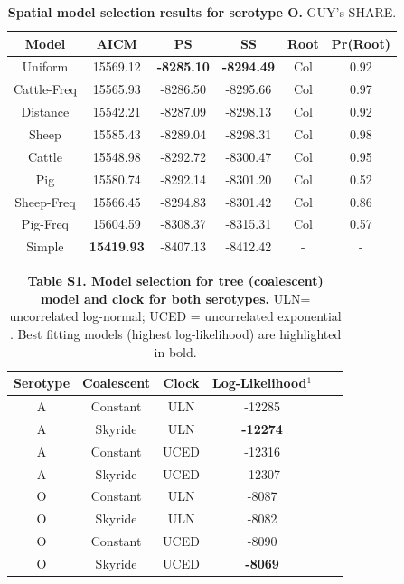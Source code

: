 \documentclass[10pt]{article}
\begin{document}
\begin{table}[!ht]
\caption{
\textbf{Spatial model selection results for serotype O. } GUY's SHARE.}
\begin{tabular}{c|c|c|c|c|c}
Model	&AICM	&PS	&SS	&Root	&Pr(Root)\\
\hline
Uniform	&15569.12	&\textbf{-8285.10}	&\textbf{-8294.49}	&Col	&0.92\\
Cattle-Freq	&15565.93	&-8286.50	&-8295.66	&Col	&0.97\\
Distance	&15542.21	&-8287.09	&-8298.13	&Col	&0.92\\
Sheep	&15585.43	&-8289.04	&-8298.31	&Col	&0.98\\
Cattle	&15548.98	&-8292.72	&-8300.47	&Col	&0.95\\
Pig	&15580.74	&-8292.14	&-8301.20	&Col	&0.52\\
Sheep-Freq	&15566.45	&-8294.83	&-8301.42	&Col	&0.86\\
Pig-Freq	&15604.59	&-8308.37	&-8315.31	&Col	&0.57\\
Simple	&\textbf{15419.93}	&-8407.13	&-8412.42	&-	&-\\
\end{tabular}
\begin{flushleft}
\end{flushleft}
\label{tab:prootO}
 \end{table}
\newpage
\begin{table}[!ht]
\caption*{\textbf{Table S1. Model selection for tree (coalescent) model and clock for both serotypes.}  ULN= uncorrelated log-normal; UCED = uncorrelated exponential . Best fitting models (highest log-likelihood) are highlighted in bold.}
\begin{tabular}{c|c|c|c|c|c}
Serotype	&Coalescent	&Clock	&Log-Likelihood$^{1}$\\
\hline
A	&Constant	&ULN	&-12285\\
A	&Skyride 	&ULN	&\textbf{-12274}\\
A	&Constant	&UCED	&-12316\\
A	&Skyride 	&UCED	&-12307\\
O	&Constant	&ULN	&-8087\\
O	&Skyride 	&ULN	&-8082\\
O	&Constant	&UCED	&-8090\\
O	&Skyride 	&UCED	&\textbf{-8069}\\
\end{tabular}
\begin{flushleft}
\end{flushleft}
\label{stab:treeclockselection}
 \end{table}
\end{document}
